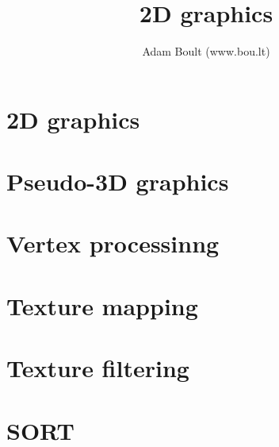 \documentclass[oneside]{book}
\begin{document}
\author{Adam Boult (www.bou.lt)}
\title{2D graphics}
\maketitle

\setcounter{tocdepth}{0}
\tableofcontents



\part{2D graphics}





\part{Pseudo-3D graphics}




\part{Vertex processinng}



\part{Texture mapping}


\part{Texture filtering}


\part{SORT}

\end{document}
